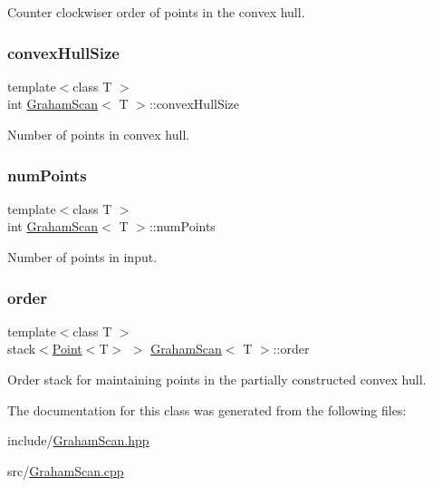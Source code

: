Counter clockwiser order of points in the convex hull. 

\mbox{\label{classGrahamScan_a5d428a11cebb2ff2f9e91d2644d7d0c5}} 
\subsubsection{\texorpdfstring{convex\+Hull\+Size}{convexHullSize}}
{\footnotesize\ttfamily template$<$class T $>$ \\
int \mbox{\hyperlink{classGrahamScan}{Graham\+Scan}}$<$ T $>$\+::convex\+Hull\+Size\hspace{0.3cm}{\ttfamily [private]}}



Number of points in convex hull. 

\mbox{\label{classGrahamScan_a4769bbdb7caacde8c368a0074fccef19}} 
\subsubsection{\texorpdfstring{num\+Points}{numPoints}}
{\footnotesize\ttfamily template$<$class T $>$ \\
int \mbox{\hyperlink{classGrahamScan}{Graham\+Scan}}$<$ T $>$\+::num\+Points\hspace{0.3cm}{\ttfamily [private]}}



Number of points in input. 

\mbox{\label{classGrahamScan_a586a222b7f2127410d9e20fda19c64d3}} 
\subsubsection{\texorpdfstring{order}{order}}
{\footnotesize\ttfamily template$<$class T $>$ \\
stack$<$\mbox{\hyperlink{classPoint}{Point}}$<$T$>$ $>$ \mbox{\hyperlink{classGrahamScan}{Graham\+Scan}}$<$ T $>$\+::order\hspace{0.3cm}{\ttfamily [private]}}



Order stack for maintaining points in the partially constructed convex hull. 



The documentation for this class was generated from the following files\+:\begin{DoxyCompactItemize}
\item 
include/\mbox{\hyperlink{GrahamScan_8hpp}{Graham\+Scan.\+hpp}}\item 
src/\mbox{\hyperlink{GrahamScan_8cpp}{Graham\+Scan.\+cpp}}\end{DoxyCompactItemize}
